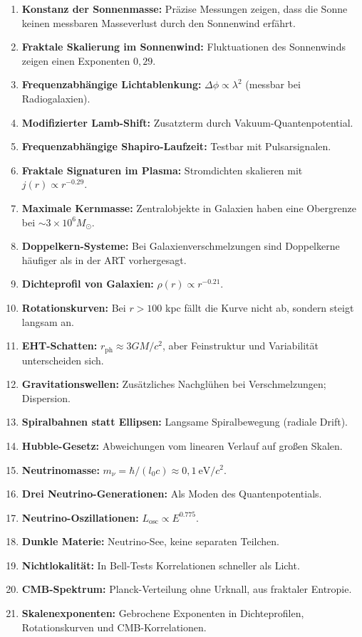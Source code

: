 \documentclass[12pt,a4paper]{article}
\begin{document}
\begin{enumerate}
\item \textbf{Konstanz der Sonnenmasse:} Präzise Messungen zeigen, dass die Sonne keinen messbaren Masseverlust durch den Sonnenwind erfährt.
\item \textbf{Fraktale Skalierung im Sonnenwind:} Fluktuationen des Sonnenwinds zeigen einen Exponenten $0,29$.
\item \textbf{Frequenzabhängige Lichtablenkung:} $\Delta\phi \propto \lambda^2$ (messbar bei Radiogalaxien).
\item \textbf{Modifizierter Lamb-Shift:} Zusatzterm durch Vakuum-Quantenpotential.
\item \textbf{Frequenzabhängige Shapiro-Laufzeit:} Testbar mit Pulsarsignalen.
\item \textbf{Fraktale Signaturen im Plasma:} Stromdichten skalieren mit $j(r) \propto r^{-0.29}$.
\item \textbf{Maximale Kernmasse:} Zentralobjekte in Galaxien haben eine Obergrenze bei $\sim 3 \times 10^6 M_{\odot}$.
\item \textbf{Doppelkern-Systeme:} Bei Galaxienverschmelzungen sind Doppelkerne häufiger als in der ART vorhergesagt.
\item \textbf{Dichteprofil von Galaxien:} $\rho(r) \propto r^{-0.21}$.
\item \textbf{Rotationskurven:} Bei $r > 100$ kpc fällt die Kurve nicht ab, sondern steigt langsam an.
\item \textbf{EHT-Schatten:} $r_{\text{ph}} \approx 3GM/c^2$, aber Feinstruktur und Variabilität unterscheiden sich.
\item \textbf{Gravitationswellen:} Zusätzliches Nachglühen bei Verschmelzungen; Dispersion.
\item \textbf{Spiralbahnen statt Ellipsen:} Langsame Spiralbewegung (radiale Drift).
\item \textbf{Hubble-Gesetz:} Abweichungen vom linearen Verlauf auf großen Skalen.
\item \textbf{Neutrinomasse:} $m_\nu = \hbar/(l_0c) \approx 0,1\ \text{eV}/c^2$.
\item \textbf{Drei Neutrino-Generationen:} Als Moden des Quantenpotentials.
\item \textbf{Neutrino-Oszillationen:} $L_{\text{osc}} \propto E^{0.775}$.
\item \textbf{Dunkle Materie:} Neutrino-See, keine separaten Teilchen.
\item \textbf{Nichtlokalität:} In Bell-Tests Korrelationen schneller als Licht.
\item \textbf{CMB-Spektrum:} Planck-Verteilung ohne Urknall, aus fraktaler Entropie.
\item \textbf{Skalenexponenten:} Gebrochene Exponenten in Dichteprofilen, Rotationskurven und CMB-Korrelationen.
\end{enumerate}
\end{document}

